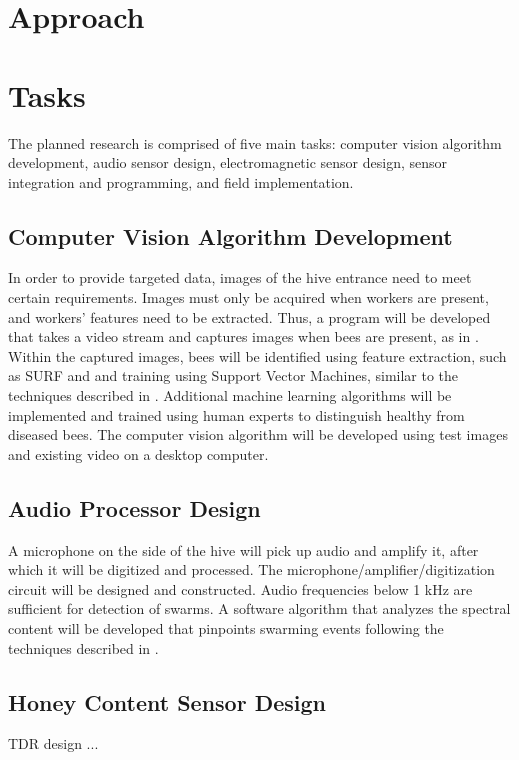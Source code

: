 \section{Approach}

\section{Tasks}

The planned research is comprised of five main tasks: computer vision algorithm development, audio sensor design, electromagnetic sensor design, sensor integration and programming, and field implementation.

\subsection{Computer Vision Algorithm Development}

In order to provide targeted data, images of the hive entrance need to meet certain requirements. Images must only be acquired when workers are present, and workers' features need to be extracted. Thus, a program will be developed that takes a video stream and captures images when bees are present, as in \cite{campbell2008video}. Within the captured images, bees will be identified using feature extraction, such as SURF and and training using Support Vector Machines, similar to the techniques described in \cite{azarcoya2014automatic}. Additional machine learning algorithms will be implemented and trained using human experts to distinguish healthy from diseased bees. The computer vision algorithm will be developed using test images and existing video on a desktop computer.

\subsection{Audio Processor Design}

A microphone on the side of the hive will pick up audio and amplify it, after which it will  be digitized and processed. The microphone/amplifier/digitization circuit will be designed and constructed. Audio frequencies below 1 kHz are sufficient for detection of swarms. A software algorithm that analyzes the spectral content will be developed that pinpoints swarming events following the techniques described in \cite{ferrari2008monitoring}.

\subsection{Honey Content Sensor Design}
TDR design ...

